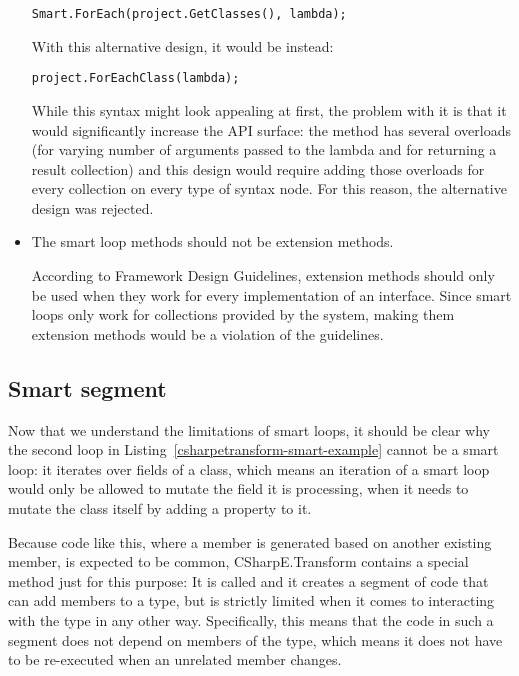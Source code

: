 \begin{itemize}
\begin{verbatim}
Smart.ForEach(project.GetClasses(), lambda);
\end{verbatim}

With this alternative design, it would be instead:

\begin{verbatim}
project.ForEachClass(lambda);
\end{verbatim}

While this syntax might look appealing at first, the problem with it is that it would significantly increase the \ac{API} surface: the  method has several overloads (for varying number of arguments passed to the lambda and for returning a result collection) and this design would require adding those overloads for every collection on every type of syntax node. For this reason, the alternative design was rejected.

\item The smart loop methods should not be extension methods.

\nopagebreak

According to Framework Design Guidelines, extension methods should only be used when they work for every implementation of an interface. \cite{fdg-extension-methods} Since smart loops only work for collections provided by the system, making them extension methods would be a violation of the guidelines.

\end{itemize}

\subsection{Smart segment}

Now that we understand the limitations of smart loops, it should be clear why the second  loop in Listing~\ref{csharpetransform-smart-example} cannot be a smart loop: it iterates over fields of a class, which means an iteration of a smart loop would only be allowed to mutate the field it is processing, when it needs to mutate the class itself by adding a property to it.

Because code like this, where a member is generated based on another existing member, is expected to be common, CSharpE.Transform contains a special method just for this purpose: It is called  and it creates a segment of code that can add members to a type, but is strictly limited when it comes to interacting with the type in any other way. Specifically, this means that the code in such a segment does not depend on members of the type, which means it does not have to be re-executed when an unrelated member changes.

